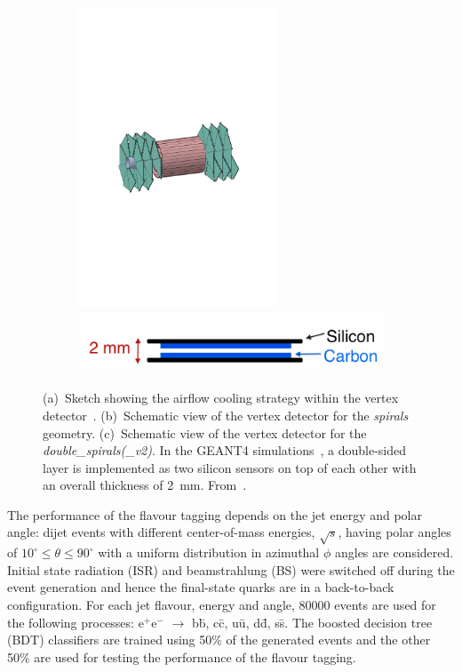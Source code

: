 \begin{figure}[htbp]
\begin{subfigure}[b]{0.25\textwidth}
    \includegraphics[trim = 32mm 98mm 85mm 106mm, clip, width=0.65\textwidth]{figures/CLIC/double_spiral.pdf} \\
    \includegraphics[width=1.5\textwidth]{figures/CLIC/double_layer_module.png} 
    \caption{}
    \label{fig:doubleLayer}
  \end{subfigure}
  \caption{(a)~Sketch showing the airflow cooling strategy within the
    vertex detector~\cite{DuarteRamos:1572989}. (b)~Schematic view of
    the vertex detector for the \emph{spirals} geometry. (c)~Schematic
    view of the vertex detector for the
    \emph{double\_spirals(\_v2)}. In the \textsc{GEANT4}
    simulations~\cite{Agostinelli:2002hh}, a double-sided layer is
    implemented as two silicon sensors on top of each other with an
    overall thickness of
    \SI{2}{\milli\meter}. From~\cite{Tehrani:2015tla}.}
  \label{fig:geometries}
\end{figure}

The performance of the flavour tagging depends on the jet energy and
polar angle: dijet events with different center-of-mass energies,
$\sqrt{s}$, having polar angles of
$10^{\circ} \leq \theta \leq 90^{\circ}$ with a uniform distribution
in azimuthal $\phi$ angles are considered. Initial state radiation
(ISR) and beamstrahlung (BS) were switched off during the event
generation and hence the final-state quarks are in a back-to-back
configuration. For each jet flavour, energy and angle, 80000 events
are used for the following processes: e$^+$e$^-$ $\rightarrow$ b\={b},
c\={c}, u\={u}, d\={d}, s\={s}. The boosted decision tree (BDT)
classifiers are trained using 50\% of the generated events and the
other 50\% are used for testing the performance of the flavour
tagging.

